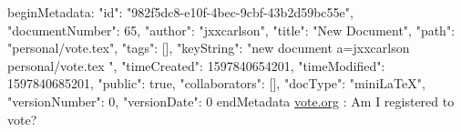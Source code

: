 beginMetadata:
{
    "id": "982f5dc8-e10f-4bec-9cbf-43b2d59bc55e",
    "documentNumber": 65,
    "author": "jxxcarlson",
    "title": "New Document",
    "path": "personal/vote.tex",
    "tags": [],
    "keyString": "new document a=jxxcarlson personal/vote.tex ",
    "timeCreated": 1597840654201,
    "timeModified": 1597840685201,
    "public": true,
    "collaborators": [],
    "docType": "miniLaTeX",
    "versionNumber": 0,
    "versionDate": 0
}
endMetadata
\href{https://www.vote.org/am-i-registered-to-vote/}{vote.org} : Am I registered to vote?